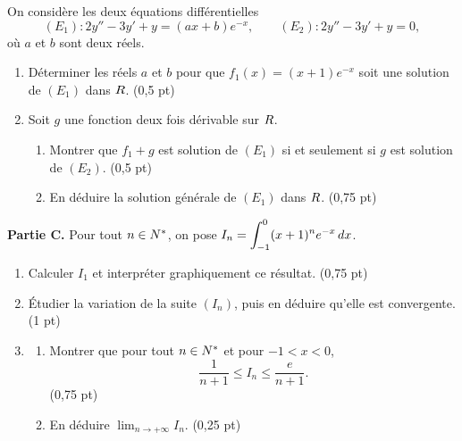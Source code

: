 \begin{commeaubac}
On considère les deux équations différentielles
\[
  (E_{1}) : 2y''-3y'+y = (ax+b)e^{-x},
  \qquad
  (E_{2}) : 2y''-3y'+y = 0,
\]
où $a$ et $b$ sont deux réels.

\begin{enumerate}[label=\textbf{\arabic*.}, leftmargin=*, itemsep=0.25em]
  \item Déterminer les réels $a$ et $b$ pour que $f_{1}(x) = (x+1)e^{-x}$ soit
        une solution de $(E_{1})$ dans $R$. \hfill\textup{(0,5 pt)}
  \item Soit $g$ une fonction deux fois dérivable sur $R$.
        \begin{enumerate}[label=\textbf{\alph*)}, leftmargin=1.4em]
          \item Montrer que $f_{1}+g$ est solution de $(E_{1})$ si et seulement
                si $g$ est solution de $(E_{2})$. \hfill\textup{(0,5 pt)}
          \item En déduire la solution générale de $(E_{1})$ dans $R$.
                \hfill\textup{(0,75 pt)}
        \end{enumerate}
\end{enumerate}

\medskip
\textbf{Partie C.} Pour tout $n \in N^{*}$, on pose
$\displaystyle I_{n} = \int_{-1}^{0}(x+1)^{n}e^{-x}\,dx$.

\begin{enumerate}[label=\textbf{\arabic*.}, leftmargin=*, itemsep=0.25em, start=3]
  \item Calculer $I_{1}$ et interpréter graphiquement ce résultat.
        \hfill\textup{(0,75 pt)}
  \item Étudier la variation de la suite $(I_{n})$, puis en déduire qu'elle est
        convergente. \hfill\textup{(1 pt)}
  \item \begin{enumerate}[label=\textbf{\alph*)}, leftmargin=1.4em]
          \item Montrer que pour tout $n \in N^{*}$ et pour $-1<x<0$,
                \[ \frac{1}{n+1} \leq I_{n} \leq \frac{e}{n+1}. \]
                \hfill\textup{(0,75 pt)}
          \item En déduire $\displaystyle\lim_{n \to +\infty} I_{n}$.
                \hfill\textup{(0,25 pt)}
        \end{enumerate}
\end{enumerate}
\end{commeaubac}

